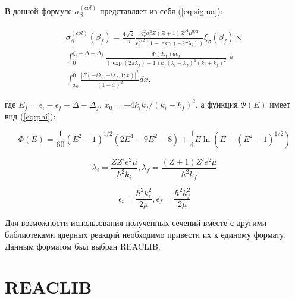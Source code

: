 \documentclass[%
master,    %
natbib,      %
subf,        %
href,        %
colorlinks,  %
]{disser}
\begin{document}
В данной формуле $\sigma_\beta^{(col)}$ представляет из себя (\ref{eq:sigma}): 

\begin{equation}
\label{eq:sigma}
\begin{split}
\sigma_\beta^{(col)}(\beta_f) =
\frac{4\sqrt{2}}{\pi}\frac{g_v^2\alpha_e^4 Z (Z + 1)Z'^4\mu^{9/2}}{\epsilon_i^{3/2}(1-\exp(-2\pi\lambda_i))}\xi_\beta(\beta_f) \times \\
\int_{0}^{\xi_i-\Delta-\Delta_f}\frac{\Phi(E_f)d\epsilon_f}{(\exp(2\pi\lambda_f)-1)k_f(k_i-k_f)^4(k_i+k_f)^2} \times \\
\int_{x_0}^{0}\frac{\left|F(-i\lambda_i,-i\lambda_f,1;x)\right|^2}{(1-x)^2}dx,
\end{split}
\end{equation}

где $E_f = \epsilon_i - \epsilon_f - \Delta - \Delta_f$, $x_0 = -4 k_i k_f / (k_i - k_f)^2$, а функция $\Phi(E)$ имеет вид (\ref{eq:phi}):

\begin{equation}
\label{eq:phi}
\Phi(E) = \frac{1}{60}(E^2-1)^{1/2}(2E^4-9E^2-8)+\frac{1}{4}E\ln(E+(E^2-1)^{1/2})
\end{equation}

\begin{equation}
\label{eq:lambda}
	\lambda_i = \frac{ZZ'e^2\mu}{\hbar^2 k_i}, \lambda_f = \frac{(Z+1)Z'e^2\mu}{\hbar^2 k_f}
\end{equation}

\begin{equation}
\label{eq:epsilon}
\epsilon_i = \frac{\hbar^2 k_i^2}{2\mu}, \epsilon_f = \frac{\hbar^2 k_f^2}{2\mu}
\end{equation}

Для возможности использования полученных сечений вместе с другими библиотеками ядерных реакций необходимо привести их к единому формату. Данным форматом был выбран REACLIB.

\section{REACLIB}
\end{document}
